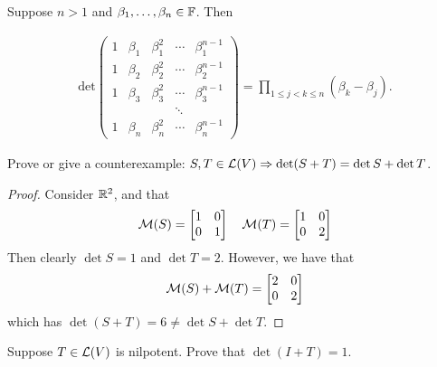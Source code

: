 \documentclass{extarticle}
\begin{document}
\begin{thm}
    Suppose \(n > 1\) and \(\beta_1, \ldots, \beta_n \in \mathbb{F}\). Then 

    \begin{align*}
        \text{det} \begin{pmatrix}
            1 & \beta_1 & \beta_1^2 & \cdots & \beta_1^{n-1} \\
            1 & \beta_2 & \beta_2^2 & \cdots & \beta_2^{n-1} \\
            1 & \beta_3 & \beta_3^2 & \cdots & \beta_3^{n-1} \\
             &  &  & \ddots &  \\
            1 & \beta_n & \beta_n^2 & \cdots & \beta_n^{n-1}
            \end{pmatrix} = \prod_{1 \leq j < k \leq n} (\beta_k - \beta_j).
    \end{align*}
\end{thm}


\newpage 
{}

\begin{problem}{1}
    Prove or give a counterexample: \(S, T \in \mathcal{L}(V) \Rightarrow \det (S+T) = \det S + \det T\). 
\end{problem}

\begin{proof}
Consider \(\mathbb{R}^2\), and that 
\[\mathcal{M}(S) = \begin{bmatrix}
    1 & 0 \\ 
    0 & 1
\end{bmatrix} \ \ \ \mathcal{M}(T) = \begin{bmatrix}
    1 & 0 \\ 
    0 & 2
\end{bmatrix}\]
Then clearly \(\det S = 1\) and \(\det T = 2\). However, we have that  
\[\mathcal{M}(S) + \mathcal{M}(T) = \begin{bmatrix}
    2 & 0 \\ 
    0 & 2
\end{bmatrix}\]
which has \(\det (S+T) = 6 \neq \det S + \det T\).
\end{proof}

\begin{problem}{3}
    Suppose \(T \in \mathcal{L}(V)\) is nilpotent. Prove that \(\det (I + T) = 1\).
\end{problem}
\end{document}
